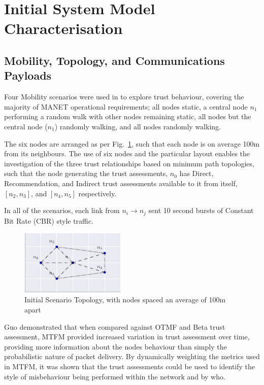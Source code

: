 \documentclass[runningheads,a4paper]{llncs}
\begin{document}
\section{Initial System Model Characterisation}\label{sec:initialsystemcharacterisation}

\subsection{Mobility, Topology, and Communications Payloads}

Four Mobility scenarios were used in \cite{Guo11} to explore trust behaviour, covering the majority of MANET operational requirements; all nodes static, a central node $n_1$ performing a random walk with other nodes remaining static, all nodes but the central node ($n_1$) randomly walking, and all nodes randomly walking.

The six nodes are arranged as per Fig.~\ref{fig:s1_layout}, such that each node is on average 100m from its neighbours. 
The use of six nodes and the particular layout enables the investigation of the three trust relationships based on minimum path topologies, such that the node generating the trust assessments, $n_0$ has Direct, Recommendation, and Indirect trust assessments available to it from itself, $[n_2,n_3]$, and $[n_4,n_5]$ respectively.

In all of the scenarios, each link from $n_i \rightarrow n_j$ sent 10 second bursts of Constant Bit Rate (CBR) style traffic.

\begin{figure}[h]
  \centering
  \includegraphics[width=0.45\textwidth]{img/s1_layout.pdf}
  \caption{Initial Scenario Topology, with nodes spaced an average of 100m apart}
  \label{fig:s1_layout}
\end{figure}

Guo demonstrated that when compared against OTMF and Beta trust assessment, MTFM provided increased variation in trust assessment over time, providing more information about the nodes behaviour than simply the probabilistic nature of packet delivery. 
By dynamically weighting the metrics used in MTFM, it was shown that the trust assessments could be used to identify the style of misbehaviour being performed within the network and by who.
\end{document}

